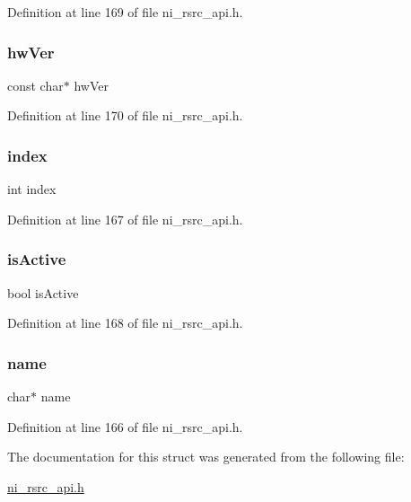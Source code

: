 Definition at line 169 of file ni\+\_\+rsrc\+\_\+api.\+h.

\mbox{\label{struct__ni__card__info_a383266b2c323217c22fe4ee349525e05}} 
\subsubsection{\texorpdfstring{hwVer}{hwVer}}
{\footnotesize\ttfamily const char$\ast$ hw\+Ver}



Definition at line 170 of file ni\+\_\+rsrc\+\_\+api.\+h.

\mbox{\label{struct__ni__card__info_a750b5d744c39a06bfb13e6eb010e35d0}} 
\subsubsection{\texorpdfstring{index}{index}}
{\footnotesize\ttfamily int index}



Definition at line 167 of file ni\+\_\+rsrc\+\_\+api.\+h.

\mbox{\label{struct__ni__card__info_a96eff8420fb9ee1b4c5d5f1bcace116d}} 
\subsubsection{\texorpdfstring{isActive}{isActive}}
{\footnotesize\ttfamily bool is\+Active}



Definition at line 168 of file ni\+\_\+rsrc\+\_\+api.\+h.

\mbox{\label{struct__ni__card__info_a5ac083a645d964373f022d03df4849c8}} 
\subsubsection{\texorpdfstring{name}{name}}
{\footnotesize\ttfamily char$\ast$ name}



Definition at line 166 of file ni\+\_\+rsrc\+\_\+api.\+h.



The documentation for this struct was generated from the following file\+:\begin{DoxyCompactItemize}
\item 
\mbox{\hyperlink{ni__rsrc__api_8h}{ni\+\_\+rsrc\+\_\+api.\+h}}\end{DoxyCompactItemize}
